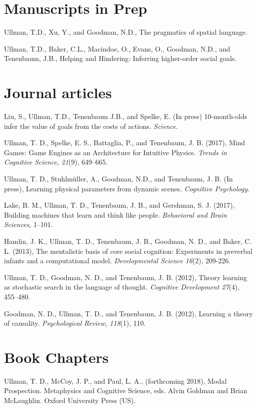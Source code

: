 \documentclass[margin,line,pifont,palatino,courier]{res}
\begin{document}
\begin{resume}
\section{\sc Manuscripts in Prep}
Ullman, T.D., Xu, Y., and Goodman, N.D., The pragmatics of spatial language. 

Ullman, T.D., Baker, C.L., Macindoe, O., Evans, O., Goodman, N.D., and Tenenbaum, J.B., Helping and Hindering: Inferring higher-order social goals. 

\section{\sc Journal articles}

Liu, S., Ullman, T.D., Tenenbaum J.B., and Spelke, E. (In press) 10-month-olds infer the value of goals from the costs of actions. \textit{Science}.

Ullman, T. D., Spelke, E. S., Battaglia, P., and Tenenbaum, J. B. (2017), Mind Games: Game Engines as an Architecture for Intuitive Physics. \textit{Trends in Cognitive Science, 21}(9), 649--665.

Ullman, T. D., Stuhlm{\"u}ller, A., Goodman, N.D., and Tenenbaum, J. B. (In press), Learning physical parameters from dynamic scenes. \textit{Cognitive Psychology.}

Lake, B. M., Ullman, T. D., Tenenbaum, J. B., and Gershman, S. J. (2017), Building machines that learn and think like people. \textit{Behavioral and Brain Sciences,} 1--101.

Hamlin, J. K., Ullman, T. D., Tenenbaum, J. B., Goodman, N. D., and Baker, C. L. (2013), The mentalistic basis of core social cognition: Experiments in preverbal infants and a computational model. \textit{Developmental Science 16}(2), 209-226.

Ullman, T. D., Goodman, N. D., and Tenenbaum, J. B. (2012), Theory learning as stochastic search in the language of thought. \textit{Cognitive Development 27}(4), 455--480.

Goodman, N. D., Ullman, T. D., and Tenenbaum, J. B. (2012), Learning a theory of causality. \textit{Psychological Review, 118}(1), 110. 

\section{\sc Book Chapters}

Ullman, T. D., McCoy, J. P., and Paul, L. A., (forthcoming 2018), Modal Prospection. Metaphysics and Cognitive Science, eds. Alvin Goldman and Brian McLaughlin. Oxford University Press (US).


\end{resume}
\end{document}

